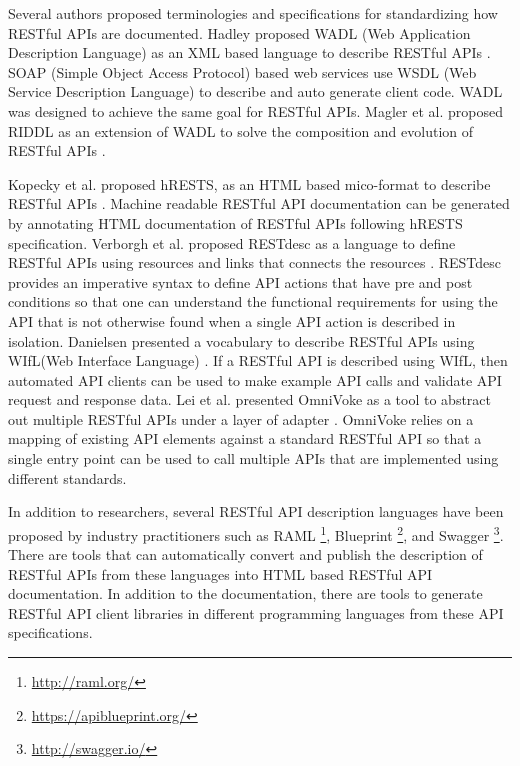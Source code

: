 \documentclass[11pt,oneside]{book}
\begin{document}
Several authors proposed terminologies and specifications for standardizing how RESTful APIs are documented. Hadley proposed WADL (Web Application Description Language) as an XML based language to describe RESTful APIs \cite{hadley2006web}. SOAP (Simple Object Access Protocol) based web services use WSDL (Web Service Description Language) to describe and auto generate client code. WADL was designed to achieve the same goal for RESTful APIs. Magler et al. proposed RIDDL as an extension of WADL to solve the composition and evolution of RESTful APIs \cite{mangler2010origin}.

Kopecky et al. proposed hRESTS, as an HTML based mico-format to describe RESTful APIs \cite{Kopecky_hrests}. Machine readable RESTful API documentation can be generated by annotating HTML documentation of RESTful APIs following hRESTS specification. Verborgh et al. proposed RESTdesc as a language to define RESTful APIs using resources and links that connects the resources \cite{RESTdesc}. RESTdesc provides an imperative syntax to define API actions that have pre and post conditions so that one can understand the functional requirements for using the API that is not otherwise found when a single API action is described in isolation. Danielsen presented a vocabulary to describe RESTful APIs using WIfL(Web Interface Language) \cite{Danielsen_validation}. If a RESTful API is described using WIfL, then automated API clients can be used to make  example API calls and validate API request and response data. Lei et al. presented OmniVoke as a tool to abstract out multiple RESTful APIs under a layer of adapter \cite{Ning_omnivoke}. OmniVoke relies on a mapping of existing API elements against a standard RESTful API so that a single entry point can be used to call multiple APIs that are implemented using different standards.

In addition to researchers, several RESTful API description languages have been proposed by industry practitioners such as RAML \footnote{\url{http://raml.org/}}, Blueprint \footnote{\url{https://apiblueprint.org/}}, and Swagger \footnote{\url{http://swagger.io/}}. There are tools that can automatically convert and publish the description of RESTful APIs from these languages into HTML based RESTful API documentation. In addition to the documentation, there are tools to generate RESTful API client libraries in different programming languages from these API specifications.
\end{document}
